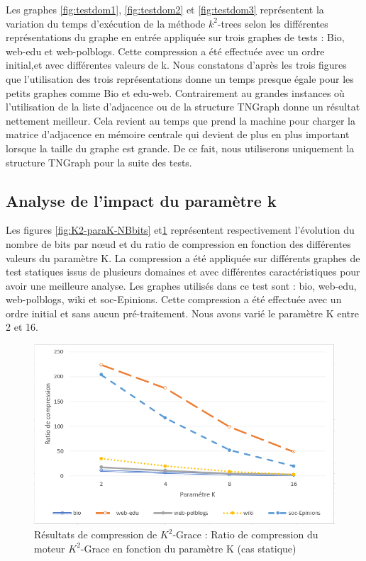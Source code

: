 Les graphes \ref{fig:testdom1}, \ref{fig:testdom2} et \ref{fig:testdom3} représentent la variation du temps d'exécution de la méthode $k^2$-trees selon les différentes représentations du graphe en entrée appliquée sur trois graphes de tests : Bio, web-edu et web-polblogs. Cette compression a été effectuée avec un ordre initial,et avec différentes valeurs de k. 
Nous constatons d'après les trois figures que l'utilisation des trois représentations donne un temps presque égale pour les petits graphes comme Bio et edu-web. Contrairement au grandes instances où l’utilisation de la liste d’adjacence ou de la structure TNGraph donne un résultat nettement meilleur. Cela revient au temps que prend la machine pour charger la matrice d'adjacence en mémoire centrale qui devient de plus en plus important lorsque la taille du graphe est grande. De ce fait, nous utiliserons uniquement la structure TNGraph pour la suite des tests.

			\subsection{Analyse de l'impact du paramètre k}
			Les figures \ref{fig:K2-paraK-NBbits} et\ref{fig:K2-paraK-Ratio} représentent respectivement l'évolution du nombre de bits par nœud et du ratio de compression en fonction des différentes valeurs du paramètre K. La compression a été appliquée sur différents graphes de test statiques issus de plusieurs domaines et avec différentes caractéristiques pour avoir une meilleure analyse. Les graphes utilisés dans ce test sont : bio, web-edu, web-polblogs, wiki et soc-Epinions. Cette compression a été effectuée avec un ordre initial et sans aucun pré-traitement.
 Nous avons varié le paramètre K entre 2 et 16.
			
\begin{figure}[H]
	\centering
	\includegraphics[scale=0.9]{ressources/image/Tests/K2-paraK-Ratio.png}
	
	\caption{Résultats de compression de $K^2$-Grace : Ratio de compression du moteur $K^2$-Grace en fonction du paramètre K (cas statique)}
	\label{fig:K2-paraK-Ratio}
\end{figure}

